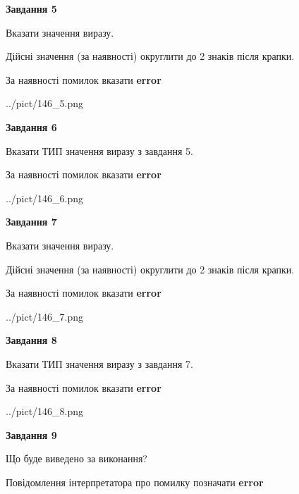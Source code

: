 \documentclass[11pt, ukrainian]{article}
\begin{document}
{\begin {large}
{\begin {center}\textbf{Завдання 5}\end {center}}\par
Вказати значення виразу. \par
Дійсні значення (за наявності) округлити до 2 знаків після крапки. \par
За наявності помилок вказати \textbf{error}

\begin{center}
	{../pict/146_5.png}
\end{center}
\newpage

{\begin {center}\textbf{Завдання 6}\end {center}}\par
Вказати ТИП значення виразу з завдання 5. \par
За наявності помилок вказати \textbf{error}

\begin{center}
	{../pict/146_6.png}
\end{center}
\newpage

{\begin {center}\textbf{Завдання 7}\end {center}}\par
Вказати значення виразу. \par
Дійсні значення (за наявності) округлити до 2 знаків після крапки. \par
За наявності помилок вказати \textbf{error}

\begin{center}
	{../pict/146_7.png}
\end{center}
\newpage

{\begin {center}\textbf{Завдання 8}\end {center}}\par
Вказати ТИП значення виразу з завдання 7. \par
За наявності помилок вказати \textbf{error}

\begin{center}
	{../pict/146_8.png}
\end{center}
\newpage

{\begin {center}\textbf{Завдання 9}\end {center}}\par
Що буде виведено за виконання? \par
Повідомлення інтерпретатора про помилку позначати \textbf{error}


\end{large}}
\end{document}
